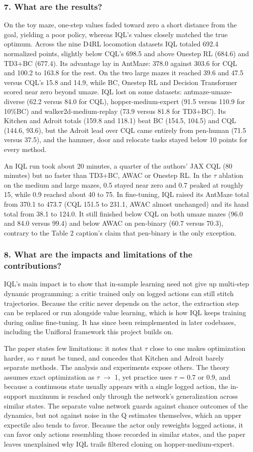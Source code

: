 \documentclass[11pt]{article}
\newcommand{\question}[1]{\subsubsection*{#1}}
\begin{document}
\question{7. What are the results?}

On the toy maze, one-step values faded toward zero a short distance from the goal, yielding a poor policy, whereas IQL's values closely matched the true optimum. Across the nine D4RL locomotion datasets IQL totaled 692.4 normalized points, slightly below CQL's 698.5 and above Onestep RL (684.6) and TD3+BC (677.4). Its advantage lay in AntMaze: 378.0 against 303.6 for CQL and 100.2 to 163.8 for the rest. On the two large mazes it reached 39.6 and 47.5 versus CQL's 15.8 and 14.9, while BC, Onestep RL and Decision Transformer scored near zero beyond umaze. IQL lost on some datasets: antmaze-umaze-diverse (62.2 versus 84.0 for CQL), hopper-medium-expert (91.5 versus 110.9 for 10\%BC) and walker2d-medium-replay (73.9 versus 81.8 for TD3+BC). Its Kitchen and Adroit totals (159.8 and 118.1) beat BC (154.5, 104.5) and CQL (144.6, 93.6), but the Adroit lead over CQL came entirely from pen-human (71.5 versus 37.5), and the hammer, door and relocate tasks stayed below 10 points for every method.

An IQL run took about 20 minutes, a quarter of the authors' JAX CQL (80 minutes) but no faster than TD3+BC, AWAC or Onestep RL. In the \ensuremath{\tau} ablation on the medium and large mazes, 0.5 stayed near zero and 0.7 peaked at roughly 15, while 0.9 reached about 40 to 75. In fine-tuning, IQL raised its AntMaze total from 370.1 to 473.7 (CQL 151.5 to 231.1, AWAC almost unchanged) and its hand total from 38.1 to 124.0. It still finished below CQL on both umaze mazes (96.0 and 84.0 versus 99.4) and below AWAC on pen-binary (60.7 versus 70.3), contrary to the Table 2 caption's claim that pen-binary is the only exception.

\question{8. What are the impacts and limitations of the contributions?}

IQL's main impact is to show that in-sample learning need not give up multi-step dynamic programming: a critic trained only on logged actions can still stitch trajectories. Because the critic never depends on the actor, the extraction step can be replaced or run alongside value learning, which is how IQL keeps training during online fine-tuning. It has since been reimplemented in later codebases, including the Unifloral framework this project builds on.

The paper states few limitations: it notes that \ensuremath{\tau} close to one makes optimization harder, so \ensuremath{\tau} must be tuned, and concedes that Kitchen and Adroit barely separate methods. The analysis and experiments expose others. The theory assumes exact optimization as \ensuremath{\tau} \ensuremath{\to} 1, yet practice uses \ensuremath{\tau} = 0.7 or 0.9, and because a continuous state usually appears with a single logged action, the in-support maximum is reached only through the network's generalization across similar states. The separate value network guards against chance outcomes of the dynamics, but not against noise in the Q estimates themselves, which an upper expectile also tends to favor. Because the actor only reweights logged actions, it can favor only actions resembling those recorded in similar states, and the paper leaves unexplained why IQL trails filtered cloning on hopper-medium-expert.
\end{document}
